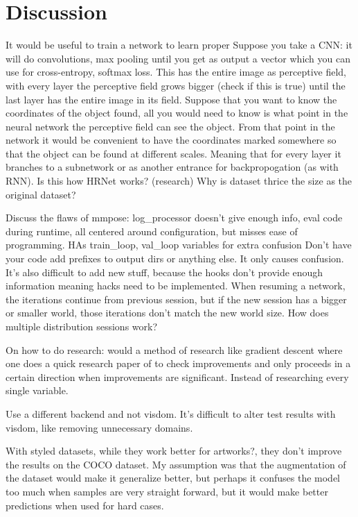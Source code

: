 \section{Discussion}
It would be useful to train a network to learn proper 
Suppose you take a \gls{CNN}: it will do convolutions, max pooling until you get as output a vector which you can use for cross-entropy, softmax loss.
This has the entire image as perceptive field, with every layer the perceptive field grows bigger (check if this is true) until the last layer has the entire image in its field.
Suppose that you want to know the coordinates of the object found, all you would need to know is what point in the neural network the perceptive field can see the object.
From that point in the network it would be convenient to have the coordinates marked somewhere so that the object can be found at different scales.
Meaning that for every layer it branches to a subnetwork or as another entrance for backpropogation (as with RNN).
Is this how HRNet works? (research)
Why is dataset thrice the size as the original dataset?

Discuss the flaws of mmpose: log\_processor doesn't give enough info, eval code during runtime, all centered around configuration, but misses ease of programming.
HAs train\_loop, val\_loop variables for extra confusion
Don't have your code add prefixes to output dirs or anything else. It only causes confusion.
It's also difficult to add new stuff, because the hooks don't provide enough information meaning hacks need to be implemented.
When resuming a network, the iterations continue from previous session, but if the new session has a bigger or smaller world, those iterations don't match the new world size.
How does multiple distribution sessions work?

On how to do research: would a method of research like gradient descent where one does a quick research paper of to check improvements and only proceeds in a certain direction when improvements are significant.
Instead of researching every single variable.

Use a different backend and not visdom. It's difficult to alter test results with visdom, like removing unnecessary domains.

With styled datasets, while they work better for artworks?, they don't improve the results on the COCO dataset.
My assumption was that the augmentation of the dataset would make it generalize better, but perhaps it confuses the model too much when samples are very straight forward, but it would make better predictions when used for hard cases.
